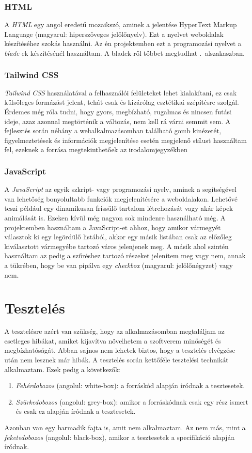 \documentclass[]{thesis-ekf}
\theoremstyle{definition}
\theoremstyle{remark}
\begin{document}
	\subsection{HTML}
		A \emph{HTML} egy angol eredetű mozaikszó, aminek a jelentése HyperText Markup Language (magyarul: hiperszöveges jelölőnyelv). Ezt a nyelvet weboldalak készítéséhez szokás használni. Az én projektemben ezt a programozási nyelvet a \emph{blade}-ek készítésénél használtam. A bladek-ről többet megtudhat .~alszakaszban.   
	\subsection{Tailwind CSS}\label{sc-tailwind}
		\emph{Tailwind CSS} használatával a felhasználói felületeket lehet kialakítani, ez csak külsőleges formázást jelent, tehát csak és kizárólag esztétikai szépítésre szolgál. Érdemes még róla tudni, hogy gyors, megbízható, rugalmas és nincsen futási ideje, azaz azonnal megtörténik a változás, nem kell rá várni semmit sem. A fejlesztés során néhány a webalkalmazásomban található gomb kinézetét, figyelmeztetések és információk megjelenítése esetén megjelenő stílust használtam fel, ezeknek a forrása megtekinthetőek az irodalomjegyzékben \cite{tailwind, FlowBite}
	\subsection{JavaScript}\label{javascript}
		A \emph{JavaScript} az egyik szkript- vagy programozási nyelv, aminek a segítségével van lehetőség bonyolultabb funkciók megjelenítésére a weboldalakon. Lehetővé teszi például egy dinamikusan frissülő tartalom létrehozását vagy akár képek animálását is. Ezeken kívül még nagyon sok mindenre használható még. A projektemben használtam a JavaScript-et ahhoz, hogy amikor vármegyét választok ki egy legördülő listából, akkor egy másik listában csak az előzőleg kiválasztott vármegyébe tartozó város jelenjenek meg. A másik ahol szintén használtam az pedig a szűréshez tartozó részeket jelenítem meg vagy nem, annak a tükrében, hogy be van pipálva egy \emph{checkbox} (magyarul: jelölőnégyzet) vagy nem. \cite{JavaScript}
		
	\chapter{Tesztelés}
		A tesztelésre azért van szükség, hogy az alkalmazásomban megtaláljam az esetleges hibákat, amiket kijavítva növelhetem a szoftverem minőségét és megbízhatóságát. Abban sajnos nem lehetek biztos, hogy a tesztelés elvégzése után nem lesznek már hibák. A tesztelés során kettőféle tesztelési technikát alkalmaztam. Ezek pedig a következők:
		\begin{enumerate}
			\item \emph{Fehérdobozos} (angolul: white-box): a forráskód alapján íródnak a tesztesetek.
			\item \emph{Szürkedobozos} (angolul: grey-box): amikor a forráskódnak csak egy rész ismert és csak ez alapján íródnak a tesztesetek.
		\end{enumerate}
		Azonban van egy harmadik fajta is, amit nem alkalmaztam. Az nem más, mint a \emph{feketedobozos} (angolul: black-box), amikor a tesztesetek a specifikáció alapján íródnak.
		\cite{Kusper}
\end{document}
